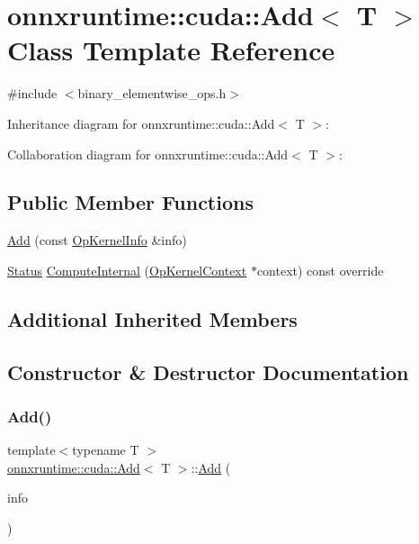 \hypertarget{classonnxruntime_1_1cuda_1_1Add}{}\section{onnxruntime\+:\+:cuda\+:\+:Add$<$ T $>$ Class Template Reference}
\label{classonnxruntime_1_1cuda_1_1Add}


{\ttfamily \#include $<$binary\+\_\+elementwise\+\_\+ops.\+h$>$}



Inheritance diagram for onnxruntime\+:\+:cuda\+:\+:Add$<$ T $>$\+:


Collaboration diagram for onnxruntime\+:\+:cuda\+:\+:Add$<$ T $>$\+:
\subsection*{Public Member Functions}
\begin{DoxyCompactItemize}
\item 
\mbox{\hyperlink{classonnxruntime_1_1cuda_1_1Add_a5c0ce6b01c90cff092e81f67b9a5155d}{Add}} (const \mbox{\hyperlink{classonnxruntime_1_1OpKernelInfo}{Op\+Kernel\+Info}} \&info)
\item 
\mbox{\hyperlink{classonnxruntime_1_1common_1_1Status}{Status}} \mbox{\hyperlink{classonnxruntime_1_1cuda_1_1Add_a34f68019a69cf99cbc2bf9adf96cbbe6}{Compute\+Internal}} (\mbox{\hyperlink{classonnxruntime_1_1OpKernelContext}{Op\+Kernel\+Context}} $\ast$context) const override
\end{DoxyCompactItemize}
\subsection*{Additional Inherited Members}


\subsection{Constructor \& Destructor Documentation}
\mbox{\label{classonnxruntime_1_1cuda_1_1Add_a5c0ce6b01c90cff092e81f67b9a5155d}} 
\subsubsection{\texorpdfstring{Add()}{Add()}}
{\footnotesize\ttfamily template$<$typename T $>$ \\
\mbox{\hyperlink{classonnxruntime_1_1cuda_1_1Add}{onnxruntime\+::cuda\+::\+Add}}$<$ T $>$\+::\mbox{\hyperlink{classonnxruntime_1_1cuda_1_1Add}{Add}} (\begin{DoxyParamCaption}\item[{const \mbox{\hyperlink{classonnxruntime_1_1OpKernelInfo}{Op\+Kernel\+Info}} \&}]{info }\end{DoxyParamCaption})\hspace{0.3cm}{\ttfamily [inline]}}



